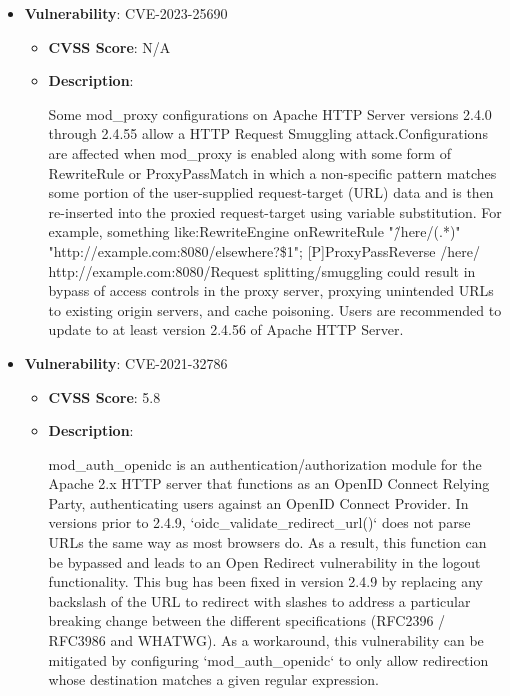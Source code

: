 \documentclass{article}
\begin{document}
\begin{itemize}
        \item \textbf{Vulnerability}: CVE-2023-25690
        \begin{itemize}
            \item \textbf{CVSS Score}:  N/A 
            \item \textbf{Description}:
            \parbox[t]{0.9\linewidth}{
                \ttfamily Some mod\_proxy configurations on Apache HTTP Server versions 2.4.0 through 2.4.55 allow a HTTP Request Smuggling attack.Configurations are affected when mod\_proxy is enabled along with some form of RewriteRule or ProxyPassMatch in which a non-specific pattern matches some portion of the user-supplied request-target (URL) data and is then re-inserted into the proxied request-target using variable substitution. For example, something like:RewriteEngine onRewriteRule "\^/here/(.*)" "http://example.com:8080/elsewhere?\$1"; [P]ProxyPassReverse /here/ http://example.com:8080/Request splitting/smuggling could result in bypass of access controls in the proxy server, proxying unintended URLs to existing origin servers, and cache poisoning. Users are recommended to update to at least version 2.4.56 of Apache HTTP Server.
            }
        \end{itemize}
    
        \item \textbf{Vulnerability}: CVE-2021-32786
        \begin{itemize}
            \item \textbf{CVSS Score}:  5.8 
            \item \textbf{Description}:
            \parbox[t]{0.9\linewidth}{
                \ttfamily mod\_auth\_openidc is an authentication/authorization module for the Apache 2.x HTTP server that functions as an OpenID Connect Relying Party, authenticating users against an OpenID Connect Provider. In versions prior to 2.4.9, `oidc\_validate\_redirect\_url()` does not parse URLs the same way as most browsers do. As a result, this function can be bypassed and leads to an Open Redirect vulnerability in the logout functionality. This bug has been fixed in version 2.4.9 by replacing any backslash of the URL to redirect with slashes to address a particular breaking change between the different specifications (RFC2396 / RFC3986 and WHATWG). As a workaround, this vulnerability can be mitigated by configuring `mod\_auth\_openidc` to only allow redirection whose destination matches a given regular expression.
            }
        \end{itemize}
    

\end{itemize}
\end{document}
